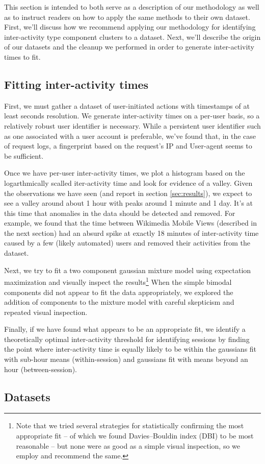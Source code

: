 This section is intended to both serve as a description of our methodology as well as to instruct readers on how to apply the same methods to their own dataset.  First, we'll discuss how we recommend applying our methodology for identifying inter-activity type component clusters to a dataset.  Next, we'll describe the origin of our datasets and the cleanup we performed in order to generate inter-activity times to fit.

\subsection{Fitting inter-activity times}
First, we must gather a dataset of user-initiated actions with timestamps of at least seconds resolution.  We generate inter-activity times on a per-user basis, so a relatively robust user identifier is necessary.  While a persistent user identifier such as one associated with a user account is preferable, we've found that, in the case of request logs, a fingerprint based on the request's IP and User-agent seems to be sufficient.

Once we have per-user inter-activity times, we plot a histogram based on the logarthmically scalled iter-activity time and look for evidence of a valley.  Given the observations we have seen (and report in section \ref{sec:results}), we expect to see a valley around about 1 hour with peaks around 1 minute and 1 day.  It's at this time that anomalies in the data should be detected and removed.  For example, we found that the time between Wikimedia Mobile Views (described in the next section) had an absurd spike at exactly 18 minutes of inter-activity time caused by a few (likely automated) users and removed their activities from the dataset.

Next, we try to fit a two component gaussian mixture model using expectation maximization\cite{benaglia2009mixtools} and visually inspect the results\footnote{Note that we tried several strategies for statistically confirming the most appropriate fit -- of which we found Davies--Bouldin index (DBI)\cite{davies1979cluster} to be most reasonable -- but none were as good as a simple visual inspection, so we employ and recommend the same.}  When the simple bimodal components did not appear to fit the data appropriately, we explored the addition of components to the mixture model with careful skepticism and repeated visual inspection.

Finally, if we have found what appears to be an appropriate fit, we identify a theoretically optimal inter-activity threshold for identifying sessions by finding the point where inter-activity time is equally likely to be within the gaussians fit with sub-hour means (within-session) and gaussians fit with means beyond an hour (between-session).

\subsection{Datasets}
